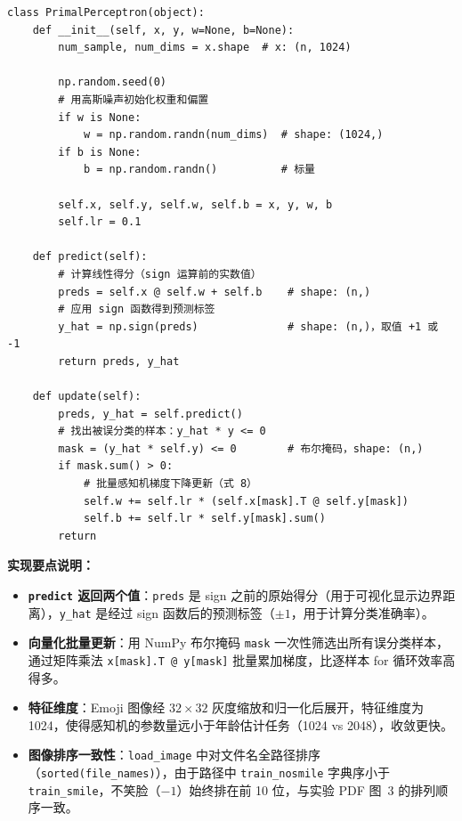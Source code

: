 \documentclass[12pt,a4paper]{ctexart}
\begin{document}
\begin{lstlisting}
class PrimalPerceptron(object):
    def __init__(self, x, y, w=None, b=None):
        num_sample, num_dims = x.shape  # x: (n, 1024)

        np.random.seed(0)
        # 用高斯噪声初始化权重和偏置
        if w is None:
            w = np.random.randn(num_dims)  # shape: (1024,)
        if b is None:
            b = np.random.randn()          # 标量

        self.x, self.y, self.w, self.b = x, y, w, b
        self.lr = 0.1

    def predict(self):
        # 计算线性得分（sign 运算前的实数值）
        preds = self.x @ self.w + self.b    # shape: (n,)
        # 应用 sign 函数得到预测标签
        y_hat = np.sign(preds)              # shape: (n,)，取值 +1 或 -1
        return preds, y_hat

    def update(self):
        preds, y_hat = self.predict()
        # 找出被误分类的样本：y_hat * y <= 0
        mask = (y_hat * self.y) <= 0        # 布尔掩码，shape: (n,)
        if mask.sum() > 0:
            # 批量感知机梯度下降更新（式 8）
            self.w += self.lr * (self.x[mask].T @ self.y[mask])
            self.b += self.lr * self.y[mask].sum()
        return
\end{lstlisting}

\textbf{实现要点说明：}

\begin{itemize}
  \item \textbf{\texttt{predict} 返回两个值}：\texttt{preds} 是 sign 之前的原始得分（用于可视化显示边界距离），\texttt{y\_hat} 是经过 sign 函数后的预测标签（$\pm 1$，用于计算分类准确率）。
  \item \textbf{向量化批量更新}：用 NumPy 布尔掩码 \texttt{mask} 一次性筛选出所有误分类样本，通过矩阵乘法 \texttt{x[mask].T @ y[mask]} 批量累加梯度，比逐样本 for 循环效率高得多。
  \item \textbf{特征维度}：Emoji 图像经 $32\times32$ 灰度缩放和归一化后展开，特征维度为 1024，使得感知机的参数量远小于年龄估计任务（1024 vs 2048），收敛更快。
  \item \textbf{图像排序一致性}：\texttt{load\_image} 中对文件名全路径排序（\texttt{sorted(file\_names)}），由于路径中 \texttt{train\_nosmile} 字典序小于 \texttt{train\_smile}，不笑脸（$-1$）始终排在前 10 位，与实验 PDF 图~3 的排列顺序一致。
\end{itemize}

\end{document}
